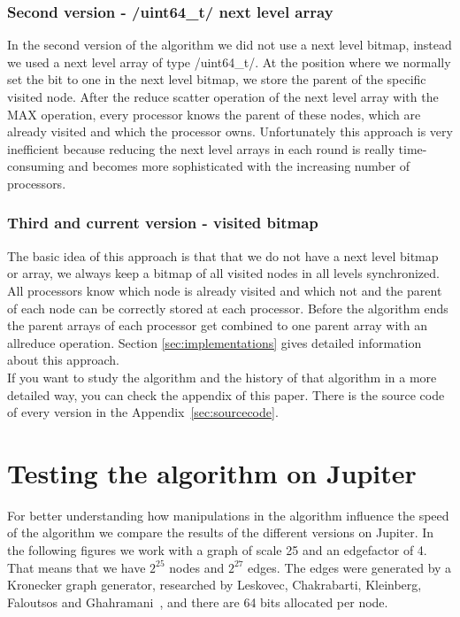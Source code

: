\documentclass[12pt,a4paper]{article}
\begin{document}
\subsubsection{Second version - \cinline/uint64_t/ next level array}
\label{sec:secondversion}

In the second version of the algorithm we did not use a next level bitmap, instead we used a next level array of type \cinline/uint64_t/. At the position where we normally set the bit to one in the next level bitmap, we store the parent of the specific visited node. After the reduce scatter operation of the next level array with the MAX operation, every processor knows the parent of these nodes, which are already visited and which the processor owns. Unfortunately this approach is very inefficient because reducing the next level arrays in each round is really time-consuming and becomes more sophisticated with the increasing number of processors.

\subsubsection{Third and current version - visited bitmap}
\label{sec:thirdversion}

The basic idea of this approach is that that we do not have a next level bitmap or array, we always keep a bitmap of all visited nodes in all levels synchronized. All processors know which node is already visited and which not and the parent of each node can be correctly stored at each processor. Before the algorithm ends the parent arrays of each processor get combined to one parent array with an allreduce operation. Section \ref{sec:implementations} gives detailed information about this approach.\\
If you want to study the algorithm and the history of that algorithm in a more detailed way, you can check the appendix of this paper. There is the source code of every version in the Appendix~\ref{sec:sourcecode}.

\section{Testing the algorithm on Jupiter}
\label{sec:testing}

For better understanding how manipulations in the algorithm influence the speed of the algorithm we compare the results of the different versions on Jupiter. In the following figures we work with a graph of scale 25 and an edgefactor of 4. That means that we have \(2^{25}\) nodes and \(2^{27}\) edges. The edges were generated by a Kronecker graph generator, researched by Leskovec, Chakrabarti, Kleinberg, Faloutsos and Ghahramani~\cite{kronecker}, and there are 64 bits allocated per node.
\end{document}
